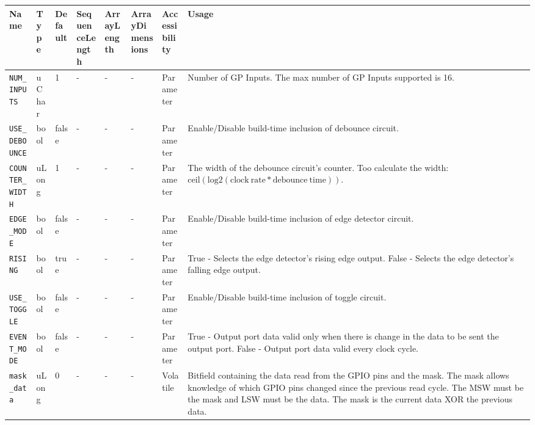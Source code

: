 \documentclass{article}
\begin{document}
\begin{landscape}
\begin{flushleft}
        \begin{scriptsize}
        \begin{tabular}{|p{2.2cm}|p{1cm}|p{1cm}|p{2cm}|p{1.5cm}|p{2cm}|p{1.5cm}|p{7cm}|}
                \hline
                \rowcolor{blue}
                Name & Type & Default & SequenceLength & ArrayLength & ArrayDimensions & Accessibility & Usage \\
                \hline
                \verb+NUM_INPUTS+ & uChar & 1 & - & - & - & Parameter & Number of GP Inputs. The max number of GP Inputs supported is 16. \\
                \hline
                \verb+USE_DEBOUNCE+ & bool & false & - & - & - & Parameter & Enable/Disable build-time inclusion of debounce circuit. \\
                \hline
                \verb+COUNTER_WIDTH+ & uLong & 1 & - & - & - & Parameter & The width of the debounce circuit's counter. Too calculate the width: $\mathrm{ceil(log2(clock\:rate * debounce\:time))}$. \\
                \hline
                \verb+EDGE_MODE+ & bool & false & - & - & - & Parameter & Enable/Disable build-time inclusion of edge detector circuit. \\
                \hline
                \verb+RISING+ & bool & true & - & - & - & Parameter & 
                True - Selects the edge detector's rising edge output. \newline
                False - Selects the edge detector's falling edge output. \\
                \hline
                \verb+USE_TOGGLE+ & bool & false & - & - & - & Parameter & Enable/Disable build-time inclusion of toggle circuit. \\
                \hline
                \verb+EVENT_MODE+ & bool & false & - & - & - & Parameter & 
                True - Output port data valid only when there is change in the data to be sent the output port. \newline
                False - Output port data valid every clock cycle. \\
                \hline
                \verb+mask_data+ & uLong & 0 & - & - & - & Volatile & Bitfield
    containing the data read from the GPIO pins and the mask. The mask allows
    knowledge of which GPIO pins changed since the previous read cycle. The MSW
    must be the mask and LSW must be the data. The mask is the current data XOR the previous data. \\
                \hline
        \end{tabular}
        \end{scriptsize}
 


\end{flushleft}
\end{landscape}
\end{document}

